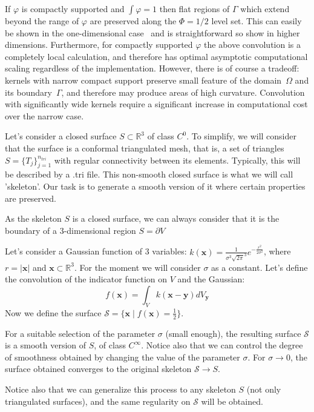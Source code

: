 \documentclass[11pt, oneside]{article}
\newcommand\bx{\boldsymbol x}
\newcommand\by{\boldsymbol y}
\renewcommand{\phi}{\varphi}
\begin{document}
If $\phi$ is compactly supported and $\int \phi = 1$ then flat regions of $\Gamma$
which
extend beyond the range of $\phi$ are preserved along the $\Phi = 1/2$ level set. This can
easily be shown in the one-dimensional case~\cite{epstein-xxxx} and is straightforward
so show in higher dimensions. Furthermore, for compactly supported $\phi$ the above convolution
is a completely local calculation, and therefore has optimal asymptotic computational
scaling regardless of the implementation. However, there is of course a tradeoff: kernels
with narrow compact support preserve small feature of the domain~$\Omega$ and its 
boundary~$\Gamma$, and therefore may produce areas of high curvature. Convolution 
with significantly wide kernels require a significant increase in computational cost
over the narrow case. 



Let's consider a closed surface $\mathit{S}\subset \mathbb{R}^3$ of class $C^0$. To simplify, we will consider that the surface is a conformal triangulated mesh, that is, a set of triangles $\mathit{S}=\{\mathit{T}_j\}_{j=1}^{n_{tri}}$ with regular connectivity between its elements. Typically, this will be described by a .tri file. This non-smooth closed surface is what we will call 'skeleton'. Our task is to generate a smooth version of it where certain properties are preserved.

As the skeleton $\mathit{S}$ is a closed surface, we can always consider that it is the boundary of a 3-dimensional region $\mathit{S}=\partial \mathit{V}$ 

Let's consider a Gaussian function of 3 variables: $k(\bx)=\frac{1}{\sigma^3\sqrt{2\pi}^3}e^{-\frac{r^2}{2\sigma^2}}$, where $r=|\bx|$ and $\bx\subset \mathbb{R}^3$. For the moment we will consider $\sigma$ as a constant.
Let's define the convolution of the indicator function on $\mathit{V}$ and the Gaussian:
$$f(\bx)=\int_{V}k(\bx-\by)dV_{\by}$$
Now we define the surface $\mathcal{S}=\{\bx \mid f(\bx)=\frac{1}{2}\}$.

For a suitable selection of the parameter $\sigma$ (small enough), the resulting surface $\mathcal{S}$ is a smooth version of $\mathit{S}$, of class $C^{\infty}$. Notice also that we can control the degree of smoothness obtained by changing the value of the parameter $\sigma$. For $\sigma \rightarrow 0$, the surface obtained converges to the original skeleton $\mathcal{S}\rightarrow \mathit{S}$.

Notice also that we can generalize this process to any skeleton $\mathit{S}$ (not only triangulated surfaces), and the same regularity on $\mathcal{S}$ will be obtained.
\end{document}
